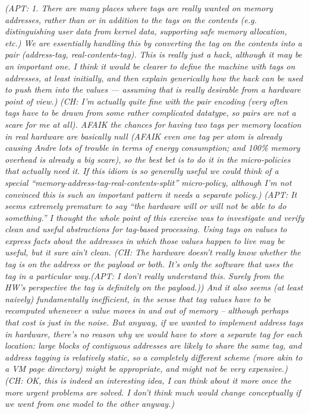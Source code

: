 \documentclass{article}
\newcommand{\ch}[1]{{\color{dkblue}\em (CH: #1)}}
\newcommand{\apt}[1]{{\color{red}\em (APT: #1)}}
\begin{document}
\apt{1. There are many places where tags are really wanted on memory addresses,
rather than or in addition to the tags on the contents (e.g. distinguishing
user data from kernel data, supporting safe memory allocation, etc.)  We are
essentially handling this by converting the tag on the contents into a pair
(address-tag, real-contents-tag).  This is really just a hack, although it
may be an important one. I think it would be clearer to define the machine with
tags on addresses, at least initially, and then explain generically how
the hack can be used to push them into the values --- assuming that is really
desirable from a hardware point of view.}
\ch{I'm actually quite fine with the pair encoding (very often tags
  have to be drawn from some rather complicated datatype, so pairs are
  not a scare for me at all). AFAIK the chances for having two tags
  per memory location in real hardware are basically null (AFAIK even
  one tag per atom is already causing Andre lots of trouble in terms
  of energy consumption; and 100\% memory overhead is already a big
  scare), so the best bet is to do it in the micro-policies that
  actually need it. If this idiom is so generally useful we could
  think of a special ``memory-address-tag-real-contents-split''
  micro-policy, although I'm not convinced this is such an important
  pattern it needs a separate policy.}
\apt{It seems extremely premature to say ``the hardware will or will
not be able to do something.''  I thought the whole point of this exercise
was to investigate and verify clean and useful abstractions for tag-based processing.
Using tags on values to express facts about the addresses in which those
values happen to live may be useful, but it sure ain't clean.
\ch{The hardware doesn't really know whether the tag is on the
  address or the payload or both. It's only the software that
  uses the tag in a particular way.\apt{I don't really understand this.
  Surely from the HW's perspective the tag is definitely on 
  the payload.}}
And it also seems (at least naively) fundamentally inefficient, 
in the sense that tag values have to be recomputed whenever a value moves
in and out of memory -- although perhaps that cost is just in the noise.
But anyway, if we wanted to implement address tags in hardware, there's no reason why
we would have to store a separate tag for each location: large blocks of
contiguous addresses are likely to share the same tag, and address tagging
is relatively static, so a completely different scheme (more akin to a VM page 
directory) might be appropriate, and might not be very expensive.}
\ch{OK, this is indeed an interesting idea, I can think about it more once
  the more urgent problems are solved. I don't think much would change
  conceptually if we went from one model to the other anyway.}
\end{document}
